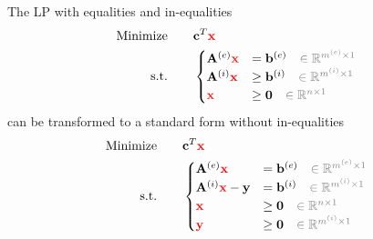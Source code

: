 \documentclass[twocolumn]{ctexart}
\begin{document}
The LP with equalities and in-equalities
\begin{equation}
    \begin{aligned}
        \label{eq:mixed_equal_and_inequal}
        \text{Minimize} \qquad &
            \mathbf{c}^T  \mathbf{\color{red} x}
        \\
        \text{s.t.} \qquad &
            \begin{cases}
                \mathbf{A}^{(e)}  \mathbf{\color{red} x}  &  =     \mathbf{b}^{(e)}  {\color{gray} \quad \in \mathbb{R}^{m^{(e)} \times 1}}  \\
                \mathbf{A}^{(i)}  \mathbf{\color{red} x}  &  \geq  \mathbf{b}^{(i)}  {\color{gray} \quad \in \mathbb{R}^{m^{(i)} \times 1}}  \\
                                  \mathbf{\color{red} x}  &  \geq  \mathbf{0}        {\color{gray} \quad \in \mathbb{R}^{n \times 1}}  \\
            \end{cases}
    \end{aligned}
\end{equation}
can be transformed to a standard form without in-equalities
\begin{equation}
    \begin{aligned}
        \label{eq:only_equal}
        \text{Minimize} \qquad &
            \mathbf{c}^T  \mathbf{\color{red} x}
        \\
        \text{s.t.} \qquad &
            \begin{cases}
                \mathbf{A}^{(e)}  \mathbf{\color{red} x}                 &  =     \mathbf{b}^{(e)}  {\color{gray} \quad \in \mathbb{R}^{m^{(e)} \times 1}}  \\
                \mathbf{A}^{(i)}  \mathbf{\color{red} x}  -  \mathbf{y}  &  =     \mathbf{b}^{(i)}  {\color{gray} \quad \in \mathbb{R}^{m^{(i)} \times 1}}  \\
                                  \mathbf{\color{red} x}                 &  \geq  \mathbf{0}        {\color{gray} \quad \in \mathbb{R}^{n       \times 1}}  \\
                                  \mathbf{\color{red} y}                 &  \geq  \mathbf{0}        {\color{gray} \quad \in \mathbb{R}^{m^{(i)} \times 1}}  \\
            \end{cases}
    \end{aligned}
\end{equation}
\end{document}
